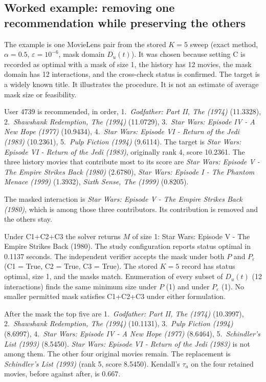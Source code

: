 \subsection{Worked example: removing one recommendation while preserving the others}
\label{sec:worked}

The example is one MovieLens pair from the stored $K=5$ sweep (exact method, $\alpha=0.5$, $\varepsilon=10^{-6}$, mask domain $D_u(t)$). It was chosen because setting C is recorded as optimal with a mask of size 1, the history has 12 movies, the mask domain has 12 interactions, and the cross-check status is confirmed. The target is a widely known title. It illustrates the procedure. It is not an estimate of average mask size or feasibility.

User 4739 is recommended, in order, 1.\ \emph{Godfather: Part II, The (1974)} (11.3328), 2.\ \emph{Shawshank Redemption, The (1994)} (11.0729), 3.\ \emph{Star Wars: Episode IV - A New Hope (1977)} (10.9434), 4.\ \emph{Star Wars: Episode VI - Return of the Jedi (1983)} (10.2361), 5.\ \emph{Pulp Fiction (1994)} (9.6114). The target is \emph{Star Wars: Episode VI - Return of the Jedi (1983)}, originally rank 4, score 10.2361. The three history movies that contribute most to its score are \emph{Star Wars: Episode V - The Empire Strikes Back (1980)} (2.6780), \emph{Star Wars: Episode I - The Phantom Menace (1999)} (1.3932), \emph{Sixth Sense, The (1999)} (0.8205).

The masked interaction is \emph{Star Wars: Episode V - The Empire Strikes Back (1980)}, which is among those three contributors. Its contribution is removed and the others stay.

Under C1+C2+C3 the solver returns $M$ of size 1: Star Wars: Episode V - The Empire Strikes Back (1980). The study configuration reports status optimal in 0.1137 seconds. The independent verifier accepts the mask under both $P$ and $P_\varepsilon$ (C1 = True, C2 = True, C3 = True). The stored $K=5$ record has status optimal, size 1, and the masks match. Enumeration of every subset of $D_u(t)$ (12 interactions) finds the same minimum size under $P$ (1) and under $P_\varepsilon$ (1). No smaller permitted mask satisfies C1+C2+C3 under either formulation.

After the mask the top five are 1.\ \emph{Godfather: Part II, The (1974)} (10.3997), 2.\ \emph{Shawshank Redemption, The (1994)} (10.1131), 3.\ \emph{Pulp Fiction (1994)} (8.6997), 4.\ \emph{Star Wars: Episode IV - A New Hope (1977)} (8.6464), 5.\ \emph{Schindler's List (1993)} (8.5450). \emph{Star Wars: Episode VI - Return of the Jedi (1983)} is not among them. The other four original movies remain. The replacement is \emph{Schindler's List (1993)} (rank 5, score 8.5450). Kendall's $\tau_a$ on the four retained movies, before against after, is 0.667.

